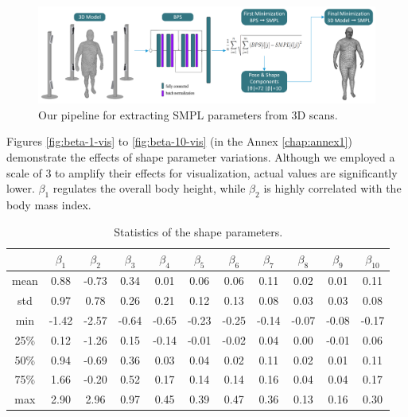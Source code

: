 \begin{figure}[H]
	\centering
	\includegraphics[width=\textwidth]{files/pipeline_smpl.png}
	\caption{Our pipeline for extracting SMPL parameters from 3D scans.}
\end{figure}

Figures \ref{fig:beta-1-vis} to \ref{fig:beta-10-vis} (in the Annex
\ref{chap:annex1}) demonstrate the effects of shape parameter variations.
Although we employed a scale of 3 to amplify their effects for visualization,
actual values are significantly lower. $\beta_1$ regulates the overall body
height, while $\beta_2$ is highly correlated with the body mass index.

\begin{table}[h]
	\centering
	\begin{tabular}{c | c c c c c c c c c c}
		\toprule
		     & $\beta_1$ & $\beta_2$ & $\beta_3$ & $\beta_4$ & $\beta_5$ & $\beta_6$ & $\beta_7$ & $\beta_8$ & $\beta_9$ & $\beta_{10}$ \\
		\midrule
		mean & 0.88      & -0.73     & 0.34      & 0.01      & 0.06      & 0.06      & 0.11      & 0.02      & 0.01      & 0.11         \\

		std  & 0.97      & 0.78      & 0.26      & 0.21      & 0.12      & 0.13      & 0.08      & 0.03      & 0.03      & 0.08         \\

		min  & -1.42     & -2.57     & -0.64     & -0.65     & -0.23     & -0.25     & -0.14     & -0.07     & -0.08     &
		-0.17                                                                                                                           \\

		25\% & 0.12      & -1.26     & 0.15      & -0.14     & -0.01     & -0.02     & 0.04      & 0.00      & -0.01     & 0.06         \\

		50\% & 0.94      & -0.69     & 0.36      & 0.03      & 0.04      & 0.02      & 0.11      & 0.02      & 0.01      & 0.11         \\

		75\% & 1.66      & -0.20     & 0.52      & 0.17      & 0.14      & 0.14      & 0.16      & 0.04      & 0.04      & 0.17         \\

		max  & 2.90      & 2.96      & 0.97      & 0.45      & 0.39      & 0.47      & 0.36      & 0.13      & 0.16      & 0.30         \\
		\bottomrule
	\end{tabular}
	\caption{Statistics of the shape parameters.}
\end{table}

